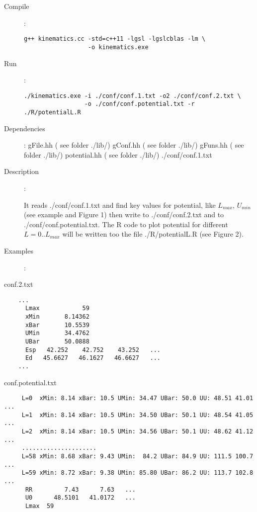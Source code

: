 \documentclass[preprint,review,12pt]{elsarticle}
\newcounter{bla}
\begin{document}
    \begin{description}
       \item[Compile]:  
        \begin{verbatim}
g++ kinematics.cc -std=c++11 -lgsl -lgslcblas -lm \
                  -o kinematics.exe
        \end{verbatim}
       \item[Run]:
        \begin{verbatim}
./kinematics.exe -i ./conf/conf.1.txt -o2 ./conf/conf.2.txt \
                 -o ./conf/conf.potential.txt -r ./R/potentialL.R
        \end{verbatim}
        
       \item [Dependencies]:
           \subitem   gFile.hh       ( see folder ./lib/)       
           \subitem   gConf.hh       ( see folder ./lib/)       
           \subitem   gFuns.hh       ( see folder ./lib/)       
           \subitem   potential.hh   ( see folder ./lib/)
           \subitem   ./conf/conf.1.txt

       \item [Description]:

           It reads ./conf/conf.1.txt and find key values for potential, like $L_{max}$, $U_{min}$ (see example and Figure 1) then write to 
           ./conf/conf.2.txt  and to  ./conf/conf.potential.txt. The R code to plot potential for different $L=0..L_{max}$ will be written too the file ./R/potentialL.R (see Figure 2). 




           
       \item [Examples]:
    \end{description}
    conf.2.txt
    \begin{verbatim}
    ...
      Lmax            59
      xMin       8.14362
      xBar       10.5539
      UMin       34.4762
      UBar       50.0888
      Esp   42.252    42.752    43.252   ...
      Ed   45.6627   46.1627   46.6627   ...
    ...
    \end{verbatim}  
    conf.potential.txt
    \begin{verbatim}
     L=0  xMin: 8.14 xBar: 10.5 UMin: 34.47 UBar: 50.0 UU: 48.51 41.01 ...
     L=1  xMin: 8.14 xBar: 10.5 UMin: 34.50 UBar: 50.1 UU: 48.54 41.05 ...
     L=2  xMin: 8.14 xBar: 10.5 UMin: 34.56 UBar: 50.1 UU: 48.62 41.12 ...
     .....................
     L=58 xMin: 8.68 xBar: 9.43 UMin:  84.2 UBar: 84.9 UU: 111.5 100.7 ...
     L=59 xMin: 8.72 xBar: 9.38 UMin: 85.80 UBar: 86.2 UU: 113.7 102.8 ...
      RR         7.43      7.63   ...
      U0      48.5101   41.0172   ...
      Lmax  59
    \end{verbatim}  
\end{document}
